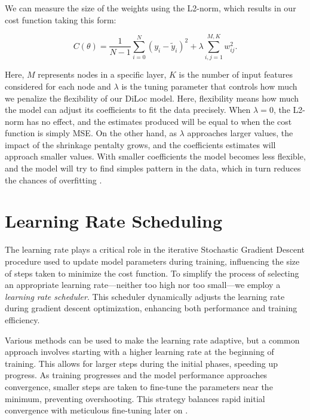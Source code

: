 \documentclass[a4paper, UKenglish, 11pt]{uiomaster}
\begin{document}
We can measure the size of the weights using the L2-norm, which results in our cost function taking this form:

\begin{equation}
C(\theta) = \frac{1}{N-1}
\sum_{i=0}^{N}(y_i-\tilde{y}_i)^2 + \lambda\sum_{i,j = 1}^{M, K}w^2_{ij}.
\label{eq:L2}
\end{equation}

Here, $M$ represents nodes in a specific layer, $K$ is the number of input features considered for each node and $\lambda$ is the tuning parameter that controls how much we penalize the flexibility of our DiLoc model. Here, flexibility means how much the model can adjust its coefficients to fit the data precisely. When $\lambda = 0$, the L2-norm has no effect, and the estimates produced will be equal to when the cost function is simply MSE. On the other hand, as $\lambda$ approaches larger values, the impact of the shrinkage pentalty grows, and the coefficients estimates will approach smaller values. With smaller coefficients the model becomes less flexible, and the model will try to find simples pattern in the data, which in turn reduces the chances of overfitting \cite{gupta2017regularization}.


\section{Learning Rate Scheduling}
The learning rate plays a critical role in the iterative Stochastic Gradient Descent procedure used to update model parameters during training, influencing the size of steps taken to minimize the cost function. To simplify the process of selecting an appropriate learning rate—neither too high nor too small—we employ a \emph{learning rate scheduler}. This scheduler dynamically adjusts the learning rate during gradient descent optimization, enhancing both performance and training efficiency.

Various methods can be used to make the learning rate adaptive, but a common approach involves starting with a higher learning rate at the beginning of training. This allows for larger steps during the initial phases, speeding up progress. As training progresses and the model performance approaches convergence, smaller steps are taken to fine-tune the parameters near the minimum, preventing overshooting. This strategy balances rapid initial convergence with meticulous fine-tuning later on \cite{pytorch_learning_rate_schedule}.
\end{document}

